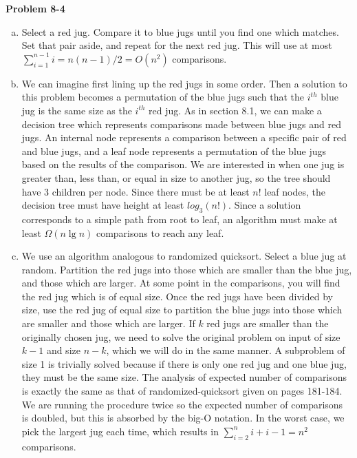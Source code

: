 \documentclass{article}
\begin{document}
\noindent\textbf{Problem 8-4}\\
\begin{enumerate}[a.]
\item Select a red jug.  Compare it to blue jugs until you find one which matches.  Set that pair aside, and repeat for the next red jug.  This will use at most $\sum_{i=1}^{n-1} i = n(n-1)/2 = O(n^2)$ comparisons. \\

\item We can imagine first lining up the red jugs in some order.  Then a solution to this problem becomes a permutation of the blue jugs such that the $i^{th}$ blue jug is the same size as the $i^{th}$ red jug. As in section 8.1, we can make a decision tree which represents comparisons made between blue jugs and red jugs.  An internal node represents a comparison between a specific pair of red and blue jugs, and a leaf node represents a permutation of the blue jugs based on the results of the comparison. We are interested in when one jug is greater than, less than, or equal in size to another jug, so the tree should have 3 children per node.  Since there must be at least $n!$ leaf nodes, the decision tree must have height at least $log_3(n!)$.  Since a solution corresponds to a simple path from root to leaf, an algorithm must make at least $\Omega(n \lg n)$ comparisons to reach any leaf. \\

\item We use an algorithm analogous to randomized quicksort. Select a blue jug at random. Partition the red jugs into those which are smaller than the blue jug, and those which are larger. At some point in the comparisons, you will find the red jug which is of equal size.  Once the red jugs have been divided by size, use the red jug of equal size to partition the blue jugs into those which are smaller and those which are larger.  If $k$ red jugs are smaller than the originally chosen jug, we need to solve the original problem on input of size $k-1$ and size $n-k$, which we will do in the same manner. A subproblem of size 1 is trivially solved because if there is only one red jug and one blue jug, they must be the same size. The analysis of expected number of comparisons is exactly the same as that of randomized-quicksort given on pages 181-184.  We are running the procedure twice so the expected number of comparisons is doubled, but this is absorbed by the big-O notation. In the worst case, we pick the largest jug each time, which results in $\sum_{i=2}^{n} i + i - 1 =n^2$ comparisons. 
\end{enumerate}
\end{document}
